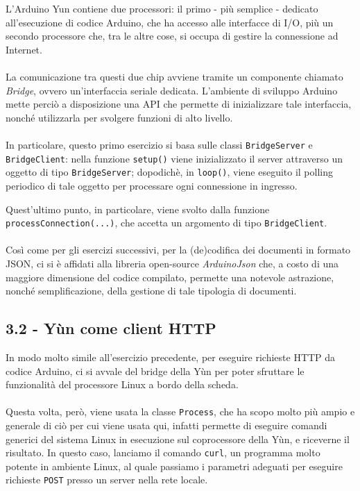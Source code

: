 \documentclass[12pt,a4paper]{article}
\begin{document}
L'Arduino Yun contiene due processori: il primo - più semplice - dedicato all'esecuzione di codice Arduino, che ha accesso alle interfacce di I/O, più un secondo processore che, tra le altre cose, si occupa di gestire la connessione ad Internet.
\\ \\
La comunicazione tra questi due chip avviene tramite un componente chiamato \textit{Bridge}, ovvero un'interfaccia seriale dedicata.
L'ambiente di sviluppo Arduino mette perciò a disposizione una API che permette di inizializzare tale interfaccia, nonché utilizzarla per svolgere funzioni di alto livello.
\\ \\
In particolare, questo primo esercizio si basa sulle classi \verb|BridgeServer| e \verb|BridgeClient|:
nella funzione \verb|setup()| viene inizializzato il server attraverso un oggetto di tipo \verb|BridgeServer|; dopodichè, in \verb|loop()|, viene eseguito il polling periodico di tale oggetto per processare ogni connessione in ingresso.

\noindent Quest'ultimo punto, in particolare, viene svolto dalla funzione \verb|processConnection(...)|, che accetta un argomento di tipo \verb|BridgeClient|.
\\ \\
Così come per gli esercizi successivi, per la (de)codifica dei documenti in formato JSON, ci si è affidati alla libreria open-source \textit{ArduinoJson} che, a costo di una maggiore dimensione del codice compilato, permette una notevole astrazione, nonché semplificazione, della gestione di tale tipologia di documenti.

\subsection{3.2 - Yùn come client HTTP}

In modo molto simile all'esercizio precedente, per eseguire richieste HTTP da codice Arduino, ci si avvale del bridge della Yùn per poter sfruttare le funzionalità del processore Linux a bordo della scheda.
\\ \\
Questa volta, però, viene usata la classe \verb|Process|, che ha scopo molto più ampio e generale di ciò per cui viene usata qui, infatti permette di eseguire comandi generici del sistema Linux in esecuzione sul coprocessore della Yùn, e riceverne il risultato. In questo caso, lanciamo il comando \verb|curl|, un programma molto potente in ambiente Linux, al quale passiamo i parametri adeguati per eseguire richieste \verb|POST| presso un server nella rete locale.
\end{document}
